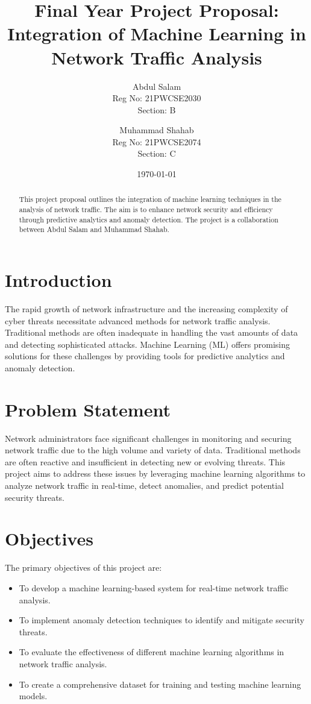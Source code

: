 \documentclass[12pt]{article}
\title{Final Year Project Proposal: Integration of Machine Learning in Network Traffic Analysis}
\author{
    Abdul Salam \\ 
    Reg No: 21PWCSE2030 \\ 
    Section: B
    \and 
    Muhammad Shahab \\ 
    Reg No: 21PWCSE2074 \\ 
    Section: C
}
\date{\today}
\begin{document}
\maketitle

\begin{abstract}
This project proposal outlines the integration of machine learning techniques in the analysis of network traffic. The aim is to enhance network security and efficiency through predictive analytics and anomaly detection. The project is a collaboration between Abdul Salam and Muhammad Shahab.
\end{abstract}

\section{Introduction}
The rapid growth of network infrastructure and the increasing complexity of cyber threats necessitate advanced methods for network traffic analysis. Traditional methods are often inadequate in handling the vast amounts of data and detecting sophisticated attacks. Machine Learning (ML) offers promising solutions for these challenges by providing tools for predictive analytics and anomaly detection.

\section{Problem Statement}
Network administrators face significant challenges in monitoring and securing network traffic due to the high volume and variety of data. Traditional methods are often reactive and insufficient in detecting new or evolving threats. This project aims to address these issues by leveraging machine learning algorithms to analyze network traffic in real-time, detect anomalies, and predict potential security threats.

\section{Objectives}
The primary objectives of this project are:
\begin{itemize}
    \item To develop a machine learning-based system for real-time network traffic analysis.
    \item To implement anomaly detection techniques to identify and mitigate security threats.
    \item To evaluate the effectiveness of different machine learning algorithms in network traffic analysis.
    \item To create a comprehensive dataset for training and testing machine learning models.
\end{itemize}
\end{document}
